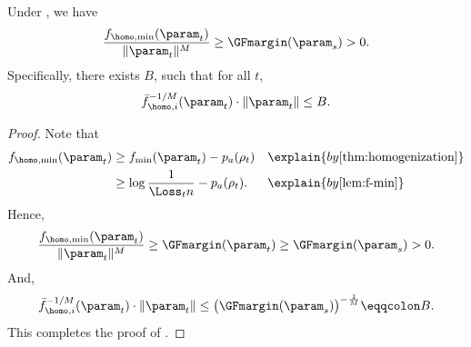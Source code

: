 \begin{lemma}
\label{lem:lowerbound-homo-margin}
Under , we have 
\[
\frac{f_{\homo,\min} (\param_t)}{\|\param_t\|^M} \ge \GFmargin(\param_s) >0.  
\]  
Specifically, there exists $B$, such that for all $t$,
\begin{equation}
\label{eq:f_M-upperbound}
\bar f_{\homo,i}^{-1 / M} (\param_t) \cdot \|\param_t\| \le B.
\end{equation}
\end{lemma}
\begin{proof}
Note that 
\begin{align*}
f_{\homo,\min} (\param_t)
&\ge f_{\min} (\param_t) - p_a(\rho_t)
&&\explain{ by \Cref{thm:homogenization}}
\\ 
&\ge \log \frac{1}{\Loss_t n} - p_a(\rho_t). 
&&\explain{ by \Cref{lem:f-min}} 
\end{align*}
Hence, 
\[
\frac{f_{\homo,\min} (\param_t)}{\|\param_t\|^M} \ge \GFmargin(\param_t)  \ge \GFmargin(\param_s)>0.  
\]  
And, 
\[
    \bar f_{\homo,i}^{-1 / M} (\param_t) \cdot \|\param_t\| \le \big(\GFmargin(\param_s) \big)^{-\frac{1}{M}} \eqqcolon B. 
\]
This completes the proof of . 
\end{proof}


 

